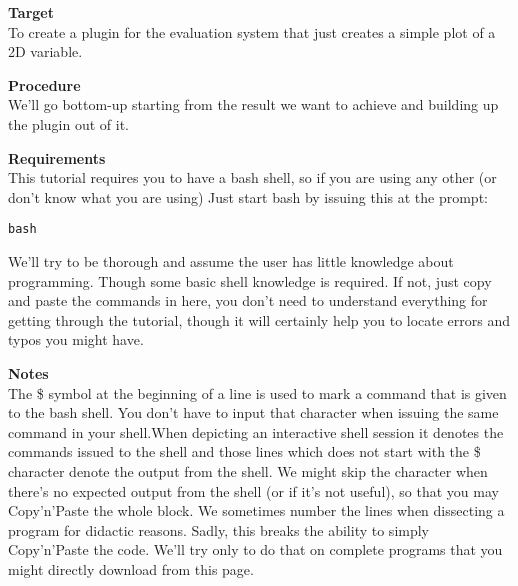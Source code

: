 \documentclass[a4paper,11pt]{ltxdoc}
\begin{document}
\textbf{Target}\\
To create a plugin for the evaluation system that just creates a simple plot of a 2D variable.

\textbf{Procedure}\\
We'll go bottom-up starting from the result we want to achieve and building up the plugin out of it.

\textbf{Requirements}\\
This tutorial requires you to have a bash shell, so if you are using any other (or don't know what you are using) Just start bash by issuing this at the prompt:
\begin{lstlisting}
bash\end{lstlisting}
We'll try to be thorough and assume the user has little knowledge about programming. Though some basic shell knowledge is required.
If not, just copy and paste the commands in here, you don't need to understand everything for getting through the tutorial, though it will certainly help you to locate errors and typos you might have.

\textbf{Notes}\\
The \$ symbol at the beginning of a line is used to mark a command that is given to the bash shell. You don't have to input that character when issuing the same command in your shell.When depicting an interactive shell session it denotes the commands issued to the shell and those lines which does not start with the \$ character denote the output from the shell. We might skip the character when there's no expected output from the shell (or if it's not useful), so that you may Copy'n'Paste the whole block. We sometimes number the lines when dissecting a program for didactic reasons. Sadly, this breaks the ability to simply Copy'n'Paste the code. We'll try only to do that on complete programs that you might directly download from this page.
\end{document}
